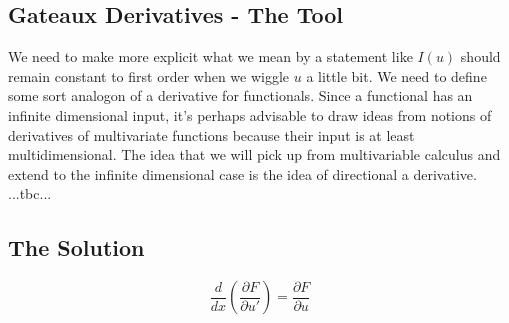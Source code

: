 \subsection{Gateaux Derivatives - The Tool}
We need to make more explicit what we mean by a statement like $I(u)$ should remain constant to first order when we wiggle $u$ a little bit. We need to define some sort analogon of a derivative for functionals. Since a functional has an infinite dimensional input, it's perhaps advisable to draw ideas from notions of derivatives of multivariate functions because their input is at least multidimensional. The idea that we will pick up from multivariable calculus and extend to the infinite dimensional case is the idea of directional a derivative. ...tbc...












\subsection{The Solution}




\begin{equation}
 \frac{d}{d x} \left(  \frac{\partial F}{\partial u'}  \right) = \frac{\partial F}{\partial u}
\end{equation}


